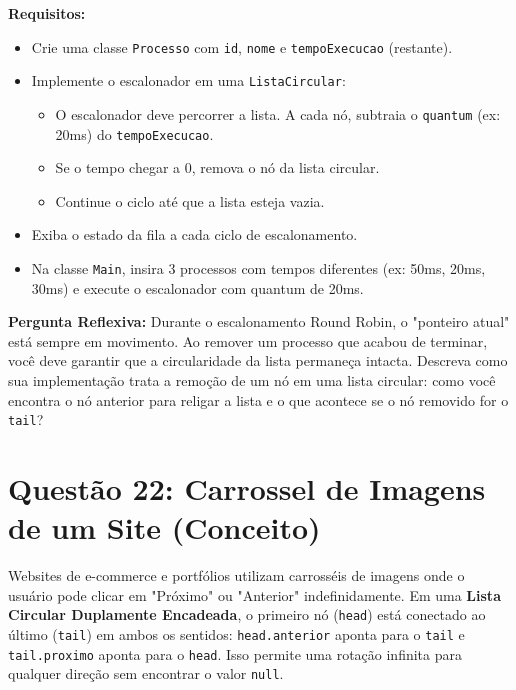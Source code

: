 \documentclass[12pt, a4paper]{article}
\begin{document}
\textbf{Requisitos:}
\begin{itemize}
    \item Crie uma classe \texttt{Processo} com \texttt{id}, \texttt{nome} e \texttt{tempoExecucao} (restante).
    \item Implemente o escalonador em uma \texttt{ListaCircular}:
    \begin{itemize}
        \item O escalonador deve percorrer a lista. A cada nó, subtraia o \texttt{quantum} (ex: 20ms) do \texttt{tempoExecucao}.
        \item Se o tempo chegar a 0, remova o nó da lista circular.
        \item Continue o ciclo até que a lista esteja vazia.
    \end{itemize}
    \item Exiba o estado da fila a cada ciclo de escalonamento.
    \item Na classe \texttt{Main}, insira 3 processos com tempos diferentes (ex: 50ms, 20ms, 30ms) e execute o escalonador com quantum de 20ms.
\end{itemize}

\textbf{Pergunta Reflexiva:} Durante o escalonamento Round Robin, o "ponteiro atual" está sempre em movimento. Ao remover um processo que acabou de terminar, você deve garantir que a circularidade da lista permaneça intacta. Descreva como sua implementação trata a remoção de um nó em uma lista circular: como você encontra o nó anterior para religar a lista e o que acontece se o nó removido for o \texttt{tail}?

\section*{Questão 22: Carrossel de Imagens de um Site (Conceito)}
Websites de e-commerce e portfólios utilizam carrosséis de imagens onde o usuário pode clicar em "Próximo" ou "Anterior" indefinidamente. Em uma \textbf{Lista Circular Duplamente Encadeada}, o primeiro nó (\texttt{head}) está conectado ao último (\texttt{tail}) em ambos os sentidos: \texttt{head.anterior} aponta para o \texttt{tail} e \texttt{tail.proximo} aponta para o \texttt{head}. Isso permite uma rotação infinita para qualquer direção sem encontrar o valor \texttt{null}.
\end{document}
